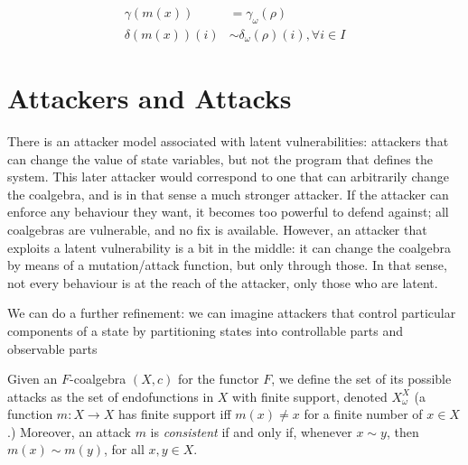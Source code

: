 

\begin{align}
\gamma(m(x))&=\gamma_\omega(\rho)\\
\delta(m(x))(i)&\sim \delta_\omega(\rho)(i), \forall i\in I
\end{align}


 
\section{Attackers and Attacks}
There is an attacker model associated with latent vulnerabilities: attackers that can change the value of state variables, but not the program that defines the system. This later attacker would correspond to one that can arbitrarily change the coalgebra, and is in that sense a much stronger attacker. If the attacker can enforce any behaviour they want, it becomes too powerful to defend against; all coalgebras are vulnerable, and no fix is available. However, an attacker that exploits a latent vulnerability is a bit in the middle: it can change the coalgebra by means of a mutation/attack function, but only through those. In that sense, not every behaviour is at the reach of the attacker, only those who are latent.

We can do a further refinement: we can imagine attackers that control particular components of a state by partitioning states into controllable parts and observable parts

\begin{definition}[Attack]
Given an $F$-coalgebra $(X,c)$ for the functor $F$, we define the set of its possible attacks as the set of endofunctions in $X$ with finite support, denoted $X^X_\omega$ (a function $m\colon X \rightarrow X$ has finite support iff $m(x)\neq x$ for a finite number of $x\in X$.) Moreover, an attack $m$ is \emph{consistent} if and only if, whenever $x\sim y$, then $m(x)\sim m(y)$, for all $x,y \in X$.
\end{definition}

